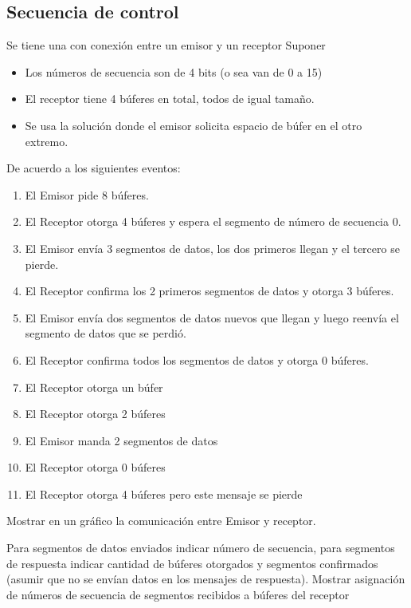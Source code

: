 \documentclass[12pt]{report}
\begin{document}
\begin{exer}
	\subsection{Secuencia de control \sthree \shard}
	Se tiene una con conexión entre un emisor y un receptor
	Suponer
	\begin{itemize}
		\item Los números de secuencia son de 4 bits (o sea van de 0 a 15)
		\item El receptor tiene 4 búferes en total, todos de igual tamaño.
		\item Se usa la solución donde el emisor solicita espacio de búfer en el otro extremo.
	\end{itemize}

	De acuerdo a los siguientes eventos:

	\begin{enumerate}
		\item El Emisor pide 8 búferes.
		\item El Receptor otorga 4 búferes y espera el segmento de número de secuencia 0.
		\item El Emisor envía 3 segmentos de datos, los dos primeros llegan y el tercero se pierde.
		\item El Receptor confirma los 2 primeros segmentos de datos y otorga 3 búferes.
		\item El Emisor envía dos segmentos de datos nuevos que llegan y luego reenvía el segmento de datos que se perdió.
		\item El Receptor confirma todos los segmentos de datos y otorga 0 búferes.
		\item El Receptor otorga un búfer
		\item El Receptor otorga 2 búferes
		\item El Emisor manda 2 segmentos de datos
		\item El Receptor otorga 0 búferes
		\item El Receptor otorga 4 búferes pero este mensaje se pierde
	\end{enumerate}

	Mostrar en un gráfico la comunicación entre Emisor y receptor.

	Para segmentos de datos enviados indicar número de secuencia, para segmentos de respuesta
	indicar cantidad de búferes otorgados y segmentos confirmados (asumir que no se envían datos en los mensajes de respuesta). Mostrar asignación de números de secuencia de segmentos recibidos a búferes del receptor
\end{exer}
\end{document}
